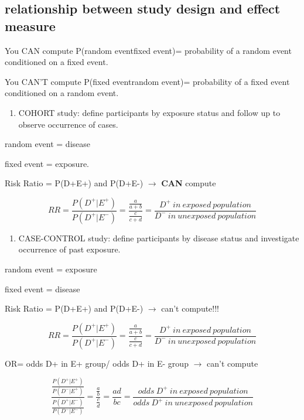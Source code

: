 \documentclass[
]{article}
\providecommand{\tightlist}{%
  \setlength{\itemsep}{0pt}\setlength{\parskip}{0pt}}
\begin{document}
\hypertarget{relationship-between-study-design-and-effect-measure}{%
\subsection{\texorpdfstring{\textbf{relationship between study design
and effect
measure}}{relationship between study design and effect measure}}\label{relationship-between-study-design-and-effect-measure}}

You CAN compute P(random event\textbar fixed event)= probability of a
random event conditioned on a fixed event.

You CAN'T compute P(fixed event\textbar random event)= probability of a
fixed event conditioned on a random event.

\begin{enumerate}
\def\labelenumi{\arabic{enumi}.}
\tightlist
\item
  COHORT study: define participants by exposure status and follow up to
  observe occurrence of cases.
\end{enumerate}

random event = disease

fixed event = exposure.

Risk Ratio = P(D+\textbar E+) and P(D+\textbar E-) \(\to\) \textbf{CAN}
compute

\[RR= \frac{P(D^+|E^+)}{P(D^+|E^-)}=\frac{\frac{a}{a+b}}{\frac{c}{c+d}}=\frac{D^+\:in\:exposed\:population}{D^-\:in\:unexposed\:population}\]

\begin{enumerate}
\def\labelenumi{\arabic{enumi}.}
\setcounter{enumi}{1}
\tightlist
\item
  CASE-CONTROL study: define participants by disease status and
  investigate occurrence of past exposure.
\end{enumerate}

random event = exposure

fixed event = disease

Risk Ratio = P(D+\textbar E+) and P(D+\textbar E-) \(\to\) can't
compute!!!

\[RR= \frac{P(D^+|E^+)}{P(D^+|E^-)}=\frac{\frac{a}{a+b}}{\frac{c}{c+d}}=\frac{D^+\:in\:exposed\:population}{D^-\:in\:unexposed\:population}\]

OR= odds D+ in E+ group/ odds D+ in E- group \(\to\) can't compute

\[\frac{\frac{P(D^+|E^+)}{P(D^-|E^+)}}{\frac{P(D^+|E^-)}{P(D^-|E^-)}}=\frac{\frac{a}{b}}{\frac{c}{d}}=\frac{ad}{bc}=\frac{odds\:D^+\:in\:exposed\:population}{odds\:D^+\:in\:unexposed\:population}\]
\end{document}
